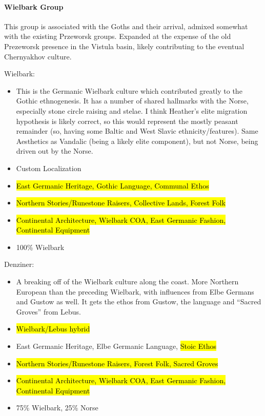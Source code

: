 \documentclass{article}
\begin{document}
	\paragraph{Wielbark Group}
	This group is associated with the Goths and their arrival, admixed somewhat with the existing Przeworsk groups.
	Expanded at the expense of the old Prezeworsk presence in the Vistula basin, likely contributing to the eventual Chernyakhov culture.
	
	Wielbark:
	\begin{itemize}
		\item This is the Germanic Wielbark culture which contributed greatly to the Gothic ethnogenesis.
		It has a number of shared hallmarks with the Norse, especially stone circle raising and stelae.
		I think Heather’s elite migration hypothesis is likely correct, so this would represent the mostly peasant remainder (so, having some Baltic and West Slavic ethnicity/features).
		Same Aesthetics as Vandalic (being a likely elite component), but not Norse, being driven out by the Norse.
		\item Custom Localization
		\item \hl{East Germanic Heritage, Gothic Language, Communal Ethos}
		\item \hl{Northern Stories/Runestone Raisers, Collective Lands, Forest Folk}
		\item \hl{Continental Architecture, Wielbark COA, East Germanic Fashion, Continental Equipment}
		\item 100\% Wielbark
	\end{itemize}
	
	Denziner:
	\begin{itemize}
		\item A breaking off of the Wielbark culture along the coast.
		More Northern European than the preceding Wielbark, with influences from Elbe Germans and Gustow as well.
		It gets the ethos from Gustow, the language and “Sacred Groves” from Lebus.
		\item \hl{Wielbark/Lebus hybrid}
		\item East Germanic Heritage, Elbe Germanic Language, \hl{Stoic Ethos}
		\item \hl{Northern Stories/Runestone Raisers, Forest Folk, Sacred Groves}
		\item \hl{Continental Architecture, Wielbark COA, East Germanic Fashion, Continental Equipment}
		\item 75\% Wielbark, 25\% Norse
	\end{itemize}
	
\end{document}
